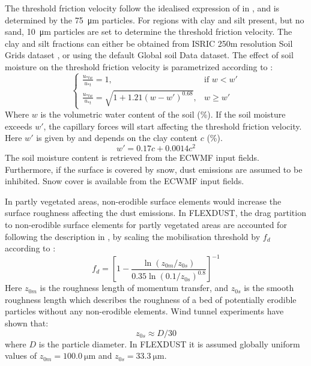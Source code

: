 The threshold friction velocity follow the idealised expression of \textcite{shao2000simple} in , and is determined by the \SI{75}{\micro\metre} particles. 
For regions with clay and silt present, but no sand, \SI{10}{\micro\metre} 
particles are set to determine the threshold friction velocity. The clay and 
silt fractions can either be obtained from ISRIC 250m resolution Soil Grids dataset 
\parencite{soil-grid_ref}, or using the default Global soil Data \cite{task2014global} dataset. 
The effect of soil moisture on the threshold friction velocity is parametrized according to \textcite{fecan1998parametrization}:
\begin{equation}
    \begin{cases}
    \frac{u_{*tw}}{u_{*t}}=1, & \text{if } w < w' \\
    \frac{u_{*tw}}{u_{*t}}=\sqrt{1+1.21(w-w')^{0.68}}, & w \geq w'
    \end{cases}
\end{equation}
Where $w$ is the volumetric water content of the soil (\%). If the soil moisture exceeds $w'$, the capillary 
forces will start affecting the threshold friction velocity. Here $w'$ is given by  
and depends on the clay content $c$ (\%).   
\begin{equation} \label{eq:moisture_clay}
    w' = 0.17c + 0.0014c^2
\end{equation}
The soil moisture content is retrieved from the ECWMF input fields.
Furthermore, if the surface is covered by snow, dust emissions are assumed to be inhibited. 
Snow cover is available from the ECWMF input fields. 
\par In partly vegetated areas, non-erodible surface elements would increase the surface 
roughness affecting the dust emissions. In FLEXDUST, the drag partition to non-erodible 
surface elements for partly vegetated areas are accounted for following the description in 
\textcite{zender2003mineral}, by scaling the mobilisation threshold by $f_d$ according to :
\begin{equation}\label{eq:drag_partition}
    f_d = \left[1 - \frac{\ln (z_{0m}/z_{0s})}{0.35\ln (0.1/z_{0s})^{0.8}}\right]^{-1}
\end{equation}
Here $z_{0m}$ is the roughness length of momentum transfer, and $z_{0s}$ is the smooth roughness length which 
describes the roughness of a bed of potentially erodible particles without any non-erodible elements. Wind tunnel 
experiments have shown that: 
\begin{equation}
    z_{0s} \approx D/30
\end{equation}
where $D$ is the particle diameter. In FLEXDUST it is assumed globally uniform values of  $z_{0m}=\SI{100.0}{\micro\metre}$ and $z_{0s}=\SI{33.3}{\micro\metre}$.

